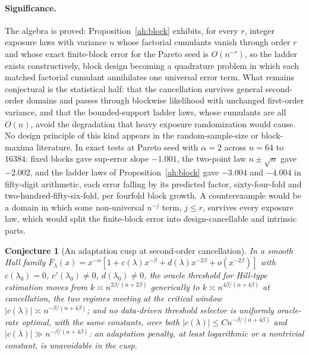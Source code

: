\documentclass[11pt]{article}
\newtheorem{conjecture}{Conjecture}
\theoremstyle{definition}
\begin{document}
\paragraph{Significance.}
The algebra is proved: Proposition~\ref{ah:block} exhibits, for every $r$, integer exposure laws with variance $n$ whose factorial cumulants vanish through order $r$ and whose exact finite-block error for the Pareto seed is $O(n^{-r})$, so the ladder exists constructively, block design becoming a quadrature problem in which each matched factorial cumulant annihilates one universal error term.  What remains conjectural is the statistical half: that the cancellation survives general second-order domains and passes through blockwise likelihood with unchanged first-order variance, and that the bounded-support ladder laws, whose cumulants are all $O(n)$, avoid the degradation that heavy exposure randomization would cause.  No design principle of this kind appears in the random-sample-size or block-maxima literature.  In exact tests at Pareto seed with $\alpha=2$ across $n=64$ to $16384$: fixed blocks gave sup-error slope $-1.001$, the two-point law $n\pm\sqrt n$ gave $-2.002$, and the ladder laws of Proposition~\ref{ah:block} gave $-3.004$ and $-4.004$ in fifty-digit arithmetic, each error falling by its predicted factor, sixty-four-fold and two-hundred-fifty-six-fold, per fourfold block growth.  A counterexample would be a domain in which some non-universal $n^{-j}$ term, $j\le r$, survives every exposure law, which would split the finite-block error into design-cancellable and intrinsic parts.

\begin{conjecture}[An adaptation cusp at second-order cancellation]\label{ah13}
In a smooth Hall family $\bar F_\lambda(x)=x^{-\alpha}[1+c(\lambda)x^{-\beta}+d(\lambda)x^{-2\beta}+o(x^{-2\beta})]$ with $c(\lambda_0)=0$, $c'(\lambda_0)\ne0$, $d(\lambda_0)\ne0$, the oracle threshold for Hill-type estimation moves from $k\asymp n^{2\beta/(\alpha+2\beta)}$ generically to $k\asymp n^{4\beta/(\alpha+4\beta)}$ at cancellation, the two regimes meeting at the critical window $|c(\lambda)|\asymp n^{-\beta/(\alpha+4\beta)}$; and no data-driven threshold selector is uniformly oracle-rate optimal, with the same constants, over both $|c(\lambda)|\le Cn^{-\beta/(\alpha+4\beta)}$ and $|c(\lambda)|\gg n^{-\beta/(\alpha+4\beta)}$: an adaptation penalty, at least logarithmic or a nontrivial constant, is unavoidable in the cusp.
\end{conjecture}
\end{document}
